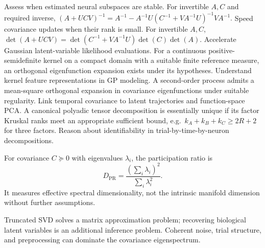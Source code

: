 {Assess when estimated neural subspaces are stable.}
{For invertible $A,C$ and required inverse,
$(A+UCV)^{-1}=A^{-1}-A^{-1}U(C^{-1}+VA^{-1}U)^{-1}VA^{-1}$.}
{Speed covariance updates when their rank is small.}
{For invertible $A,C$,
$\det(A+UCV)=\det(C^{-1}+VA^{-1}U)\det(C)\det(A)$.}
{Accelerate Gaussian latent-variable likelihood evaluations.}
{For a continuous positive-semidefinite kernel on a compact
domain with a suitable finite reference measure,
an orthogonal eigenfunction expansion exists under its hypotheses.}
{Understand kernel feature representations in GP modeling.}
{A second-order process admits a mean-square orthogonal expansion
in covariance eigenfunctions under suitable regularity.}
{Link temporal covariance to latent trajectories and function-space PCA.}
{A canonical polyadic tensor decomposition is essentially unique
if its factor Kruskal ranks meet an appropriate sufficient bound,
e.g.\ $k_A+k_B+k_C\geq 2R+2$ for three factors.}
{Reason about identifiability in trial-by-time-by-neuron decompositions.}

\begin{definition}
For covariance $C\succeq0$ with eigenvalues $\lambda_i$,
the participation ratio is
\[
D_{\mathrm{PR}}=\frac{(\sum_i\lambda_i)^2}{\sum_i\lambda_i^2}.
\]
It measures effective spectral dimensionality, not the intrinsic
manifold dimension without further assumptions.
\end{definition}
\begin{caution}
Truncated SVD solves a matrix approximation problem; recovering
biological latent variables is an additional inference problem.
Coherent noise, trial structure, and preprocessing can dominate
the covariance eigenspectrum.
\end{caution}
